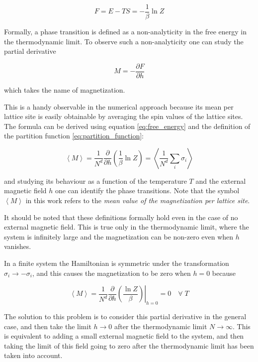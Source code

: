\begin{equation}
  F = E - TS = - \frac{1}{\beta} \ln{Z}
  \label{eq:free_energy}
\end{equation}

Formally, a phase transition is defined as a non-analyticity in the free energy in the thermodynamic limit. To observe such a non-analyticity one can study the  partial derivative

\begin{equation}
  M = - \frac{\partial F}{\partial h}
  \label{def:magnetization}
\end{equation}

which takes the name of magnetization.

This is a handy observable in the numerical approach because its mean per lattice site is easily obtainable by averaging the spin values of the lattice sites. The formula can be derived using equation \ref{eq:free_energy} and the definition of the partition function \ref{eq:partition_function}:

\begin{equation}
  \left<M\right> = \frac{1}{N^d} \frac{\partial}{\partial h} \left( \frac{1}{\beta} \ln{Z} \right) = \left< \frac{1}{N^d} \sum_{i} \sigma_i \right>
\end{equation}

and studying its behaviour as a function of the temperature $T$ and the external magnetic field $h$ one can identify the phase transitions. Note that the symbol $\left< M \right>$ in this work refers to the \textit{mean value of the magnetization per lattice site}.

It should be noted that these definitions formally hold even in the case of no external magnetic field. This is true only in the thermodynamic limit, where the system is infinitely large and the magnetization can be non-zero even when $h$ vanishes.

In a finite system the Hamiltonian is symmetric under the transformation $\sigma_i \rightarrow -\sigma_i$, and this causes the magnetization to be zero when $h = 0$ because 

\begin{equation}
  \left<M\right> = \left. \frac{1}{N^d} \frac{\partial}{\partial h} \left( \frac{\ln{Z}}{\beta} \right) \right|_{h=0} = 0 \quad \forall \; T
\end{equation}

The solution to this problem is to consider this partial derivative in the general case, and then take the limit $h \rightarrow 0$ after the thermodynamic limit $N \rightarrow \infty$. This is equivalent to adding a small external magnetic field to the system, and then taking the limit of this field going to zero after the thermodynamic limit has been taken into account.

